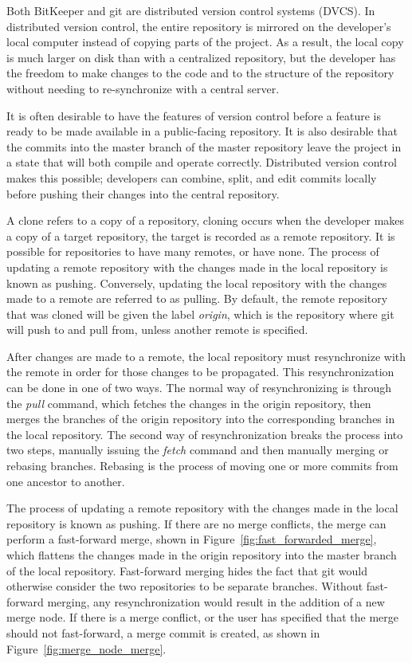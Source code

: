 Both BitKeeper and git are distributed version control systems (DVCS).
In distributed version control, the entire repository is mirrored on
the developer's local computer instead of copying parts of the project.
As a result, the local copy is much larger on disk than with a
centralized repository, but the developer has the freedom to make
changes to the code and to the
structure of the repository without needing to re-synchronize with a
central server.

It is often desirable to have the features of version control
before a feature is ready to be made available in a public-facing
repository.
It is also desirable that the commits into the master branch of the
master repository leave the project in a state that will both compile
and operate correctly.
Distributed version control makes this possible; developers can combine,
split, and edit commits locally before pushing their changes into the
central repository.

A clone refers to a copy of a repository, cloning occurs when the
developer makes a copy of a target repository, the target is recorded as
a remote repository.
It is possible for repositories to have many remotes, or have none.
The process of updating a remote repository with the changes made in the
local repository is known as pushing.
Conversely, updating the local repository with the changes made to a
remote are referred to as pulling.
By default, the remote repository that was cloned will be given the
label \textit{origin}, which is the repository where git will push to
and pull from, unless another remote is specified.

After changes are made to a remote, the local repository must
resynchronize with the remote in order for those changes to be
propagated.
This resynchronization can be done in one of two ways.
The normal way of resynchronizing is through the \textit{pull} command,
which fetches the changes in the origin repository, then merges the
branches of the origin repository into the corresponding branches in the
local repository.
The second way of resynchronization breaks the process into two steps,
manually issuing the \textit{fetch} command and then manually merging or rebasing
branches.
Rebasing is the process of moving one or more commits from one ancestor
to another.

The process of updating a remote repository with the changes made in
the local repository is known as pushing.
If there are no merge conflicts, the merge can perform a fast-forward
merge, shown in Figure~\ref{fig:fast_forwarded_merge},
which flattens the changes made in the origin repository into the
master branch of the local repository.
Fast-forward merging hides the fact that git would otherwise consider
the two repositories to be separate branches.
Without fast-forward merging, any resynchronization would result in the
addition of a new merge node.
If there is a merge conflict, or the user has specified that the merge
should not fast-forward, a merge commit is created, as shown in
Figure~\ref{fig:merge_node_merge}.

